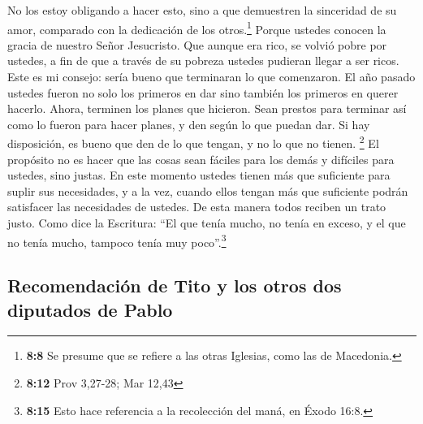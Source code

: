  No los estoy obligando a hacer esto, sino a que
demuestren la sinceridad de su amor, comparado con la dedicación de los
otros.\footnote{\textbf{8:8} Se presume que se refiere a las otras
  Iglesias, como las de Macedonia.}  Porque ustedes
conocen la gracia de nuestro Señor Jesucristo. Que aunque era rico, se
volvió pobre por ustedes, a fin de que a través de su pobreza ustedes
pudieran llegar a ser ricos.  Este es mi consejo: sería
bueno que terminaran lo que comenzaron. El año pasado ustedes fueron no
solo los primeros en dar sino también los primeros en querer hacerlo.
 Ahora, terminen los planes que hicieron. Sean prestos
para terminar así como lo fueron para hacer planes, y den según lo que
puedan dar.  Si hay disposición, es bueno que den de lo
que tengan, y no lo que no tienen. \footnote{\textbf{8:12} Prov 3,27-28;
  Mar 12,43}  El propósito no es hacer que las cosas sean
fáciles para los demás y difíciles para ustedes, sino justas.
 En este momento ustedes tienen más que suficiente para
suplir sus necesidades, y a la vez, cuando ellos tengan más que
suficiente podrán satisfacer las necesidades de ustedes. De esta manera
todos reciben un trato justo.  Como dice la Escritura:
``El que tenía mucho, no tenía en exceso, y el que no tenía mucho,
tampoco tenía muy poco''.\footnote{\textbf{8:15} Esto hace referencia a
  la recolección del maná, en Éxodo 16:8.}

\hypertarget{recomendaciuxf3n-de-tito-y-los-otros-dos-diputados-de-pablo}{%
\subsection{Recomendación de Tito y los otros dos diputados de
Pablo}\label{recomendaciuxf3n-de-tito-y-los-otros-dos-diputados-de-pablo}}

